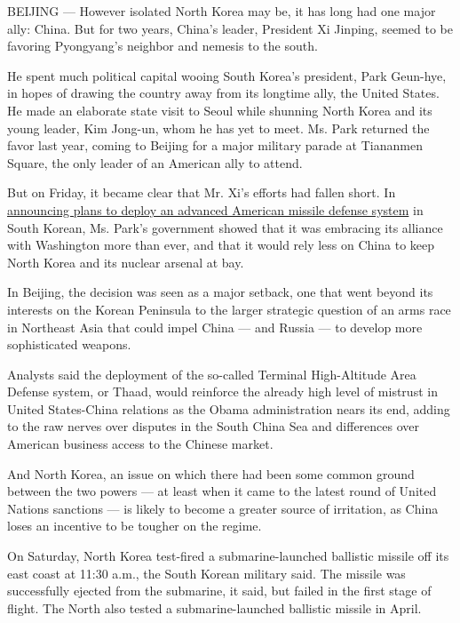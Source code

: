 BEIJING --- However isolated North Korea may be, it has long had one
major ally: China. But for two years, China's leader, President Xi
Jinping, seemed to be favoring Pyongyang's neighbor and nemesis to the
south.

He spent much political capital wooing South Korea's president, Park
Geun-hye, in hopes of drawing the country away from its longtime ally,
the United States. He made an elaborate state visit to Seoul while
shunning North Korea and its young leader, Kim Jong-un, whom he has yet
to meet. Ms. Park returned the favor last year, coming to Beijing for a
major military parade at Tiananmen Square, the only leader of an
American ally to attend.

But on Friday, it became clear that Mr. Xi's efforts had fallen short.
In
\href{http://www.nytimes3xbfgragh.onion/2016/07/08/world/asia/south-korea-and-us-agree-to-deploy-missile-defense-system.html}{announcing
plans to deploy an advanced American missile defense system} in South
Korean, Ms. Park's government showed that it was embracing its alliance
with Washington more than ever, and that it would rely less on China to
keep North Korea and its nuclear arsenal at bay.

In Beijing, the decision was seen as a major setback, one that went
beyond its interests on the Korean Peninsula to the larger strategic
question of an arms race in Northeast Asia that could impel China ---
and Russia --- to develop more sophisticated weapons.

Analysts said the deployment of the so-called Terminal High-Altitude
Area Defense system, or Thaad, would reinforce the already high level of
mistrust in United States-China relations as the Obama administration
nears its end, adding to the raw nerves over disputes in the South China
Sea and differences over American business access to the Chinese market.

And North Korea, an issue on which there had been some common ground
between the two powers --- at least when it came to the latest round of
United Nations sanctions --- is likely to become a greater source of
irritation, as China loses an incentive to be tougher on the regime.

On Saturday, North Korea test-fired a submarine-launched ballistic
missile off its east coast at 11:30 a.m., the South Korean military
said. The missile was successfully ejected from the submarine, it said,
but failed in the first stage of flight. The North also tested a
submarine-launched ballistic missile in April.

